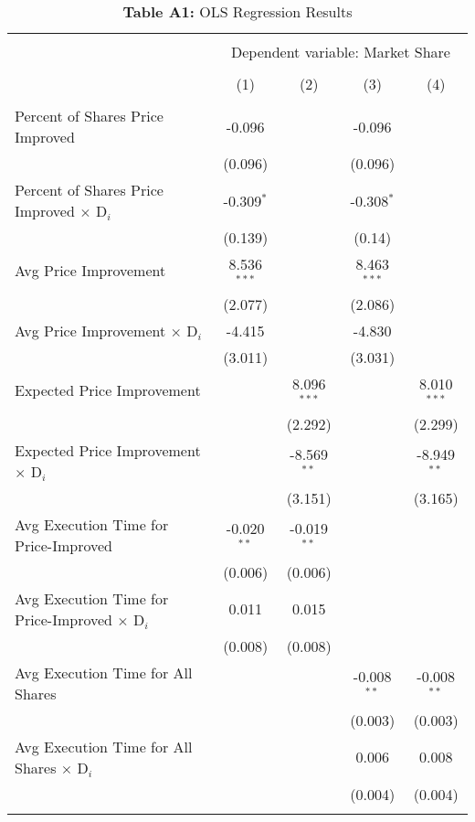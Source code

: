 \documentclass[12pt,a4paper]{article}
\begin{document}
\begin{table}[h] 
	\caption*{\textbf{Table A1:} OLS Regression Results}
	\label{} 
	\centering
	\footnotesize
	\begin{tabular}{@{\extracolsep{1.39em}}lcccc} 
		\\[-4ex]\hline 
		\hline \\[-2ex] 
		& \multicolumn{4}{c}{Dependent variable: Market Share} \\ 
		\cline{2-5} \\[-2ex]
		& (1) & (2) & (3) & (4) \\[.4ex]  
		\hline \\[-1.8ex] 
		Percent of Shares Price Improved & -0.096 &  & -0.096 & \\
		& (0.096) &  & (0.096) & \\ [0.5ex]
		Percent of Shares Price Improved $\times$ D$_i$ & -0.309$^{*}$ &  & -0.308$^{*}$ & \\
		& (0.139) &  & (0.14) & \\ [0.5ex]
		Avg Price Improvement & 8.536$^{***}$ &  & 8.463$^{***}$ & \\
		& (2.077) &  & (2.086) & \\ [0.5ex]
		Avg Price Improvement $\times$ D$_i$ & -4.415 &  & -4.830 & \\
		& (3.011) &  & (3.031) & \\ [0.5ex]
		Expected Price Improvement &  & 8.096$^{***}$ &  & 8.010$^{***}$\\
		&  & (2.292) &  & (2.299)\\ [0.5ex]
		Expected Price Improvement $\times$ D$_i$  &  & -8.569$^{**}$ &  & -8.949$^{**}$\\
		&  & (3.151) &  & (3.165)\\ [0.5ex]
		Avg Execution Time for Price-Improved & -0.020$^{**}$ & -0.019$^{**}$ &  & \\
		& (0.006) & (0.006) &  & \\ [0.5ex]
		Avg Execution Time for Price-Improved  $\times$ D$_i$  & 0.011 & 0.015 &  & \\
		& (0.008) & (0.008) &  & \\ [0.5ex]
		Avg Execution Time for All Shares &  &  & -0.008$^{**}$ & -0.008$^{**}$\\
		&  &  & (0.003) & (0.003)\\ [0.5ex]
		Avg Execution Time for All Shares  $\times$ D$_i$  &  &  & 0.006 & 0.008\\
		&  &  & (0.004) & (0.004)\\ [0.5ex]
		\hline \\[-1.8ex] 

\end{tabular}
\end{table}
\end{document}
